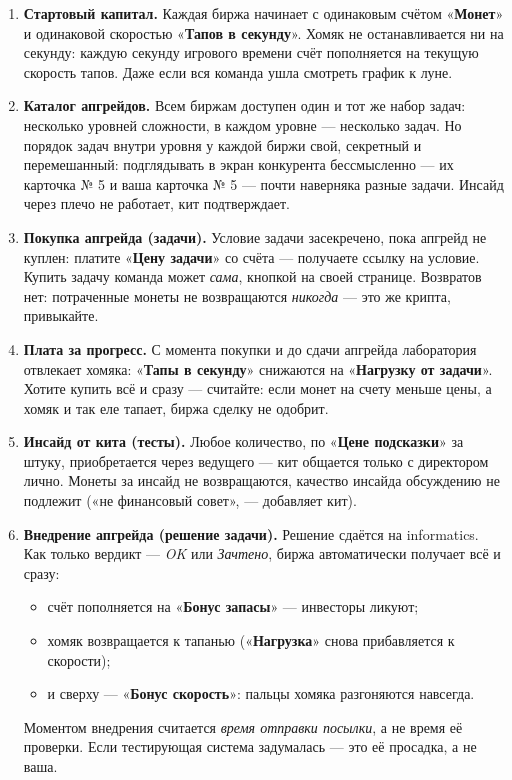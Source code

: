 \documentclass[12pt,a4paper]{article}
\newcommand{\term}[1]{«\textbf{#1}»}
\begin{document}
\begin{enumerate}[leftmargin=1.6em,itemsep=2pt]

\item \textbf{Стартовый капитал.} Каждая биржа начинает с одинаковым
счётом \term{Монет} и одинаковой скоростью \term{Тапов в секунду}.
Хомяк не останавливается ни на секунду: каждую секунду игрового времени
счёт пополняется на текущую скорость тапов. Даже если вся команда ушла
смотреть график к луне.

\item \textbf{Каталог апгрейдов.} Всем биржам доступен один и тот же
набор задач: несколько уровней сложности, в каждом уровне --- несколько
задач. Но порядок задач внутри уровня у каждой биржи свой, секретный
и перемешанный: подглядывать в экран конкурента бессмысленно ---
их карточка № 5 и ваша карточка № 5 --- почти наверняка разные задачи.
Инсайд через плечо не работает, кит подтверждает.

\item \textbf{Покупка апгрейда (задачи).} Условие задачи засекречено,
пока апгрейд не куплен: платите \term{Цену задачи} со счёта ---
получаете ссылку на условие. Купить задачу команда может \emph{сама},
кнопкой на своей странице. Возвратов нет: потраченные монеты
не возвращаются \emph{никогда} --- это же крипта, привыкайте.

\item \textbf{Плата за прогресс.} С момента покупки и до сдачи апгрейда
лаборатория отвлекает хомяка: \term{Тапы в секунду} снижаются
на \term{Нагрузку от задачи}. Хотите купить всё и сразу --- считайте:
если монет на счету меньше цены, а хомяк и так еле тапает,
биржа сделку не одобрит.

\item \textbf{Инсайд от кита (тесты).} Любое количество,
по \term{Цене подсказки} за штуку, приобретается через ведущего ---
кит общается только с директором лично. Монеты за инсайд
не возвращаются, качество инсайда обсуждению не подлежит
(«не финансовый совет», --- добавляет кит).

\item \textbf{Внедрение апгрейда (решение задачи).} Решение сдаётся
на informatics. Как только вердикт --- \emph{OK} или \emph{Зачтено},
биржа автоматически получает всё и сразу:
\begin{itemize}[itemsep=0pt]
	\item счёт пополняется на \term{Бонус запасы} --- инвесторы ликуют;
	\item хомяк возвращается к тапанью
	(\term{Нагрузка} снова прибавляется к скорости);
	\item и сверху --- \term{Бонус скорость}: пальцы хомяка разгоняются
	навсегда.
\end{itemize}
Моментом внедрения считается \emph{время отправки посылки}, а не время
её проверки. Если тестирующая система задумалась --- это её просадка,
а не ваша.


\end{enumerate}
\end{document}

